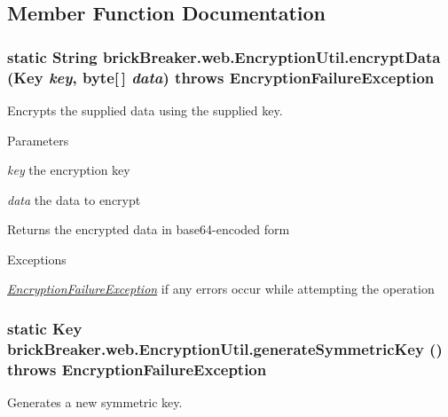 \subsection{Member Function Documentation}
\hypertarget{classbrick_breaker_1_1web_1_1_encryption_util_ae0698d40ded2bf0a720b0c4720b9a79e}{
\subsubsection[{encryptData}]{\setlength{\rightskip}{0pt plus 5cm}static String brickBreaker.web.EncryptionUtil.encryptData (Key {\em key}, \/  byte\mbox{[}$\,$\mbox{]} {\em data})  throws {\bf EncryptionFailureException} }}
\label{classbrick_breaker_1_1web_1_1_encryption_util_ae0698d40ded2bf0a720b0c4720b9a79e}
Encrypts the supplied data using the supplied key.


\begin{DoxyParams}{Parameters}
\item[{\em key}]the encryption key \item[{\em data}]the data to encrypt\end{DoxyParams}
\begin{DoxyReturn}{Returns}
the encrypted data in base64-\/encoded form
\end{DoxyReturn}

\begin{DoxyExceptions}{Exceptions}
\item[{\em \hyperlink{classbrick_breaker_1_1web_1_1_encryption_failure_exception}{EncryptionFailureException}}]if any errors occur while attempting the operation \end{DoxyExceptions}
\hypertarget{classbrick_breaker_1_1web_1_1_encryption_util_abcaff8736b7a22264577aa8a992733b2}{
\subsubsection[{generateSymmetricKey}]{\setlength{\rightskip}{0pt plus 5cm}static Key brickBreaker.web.EncryptionUtil.generateSymmetricKey ()  throws {\bf EncryptionFailureException} }}
\label{classbrick_breaker_1_1web_1_1_encryption_util_abcaff8736b7a22264577aa8a992733b2}
Generates a new symmetric key.

